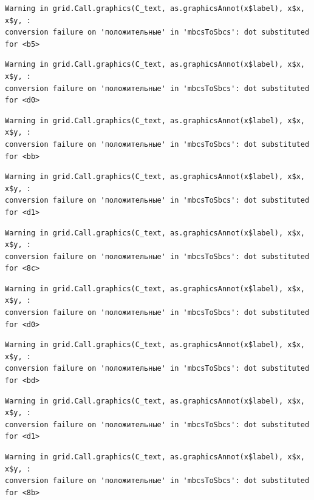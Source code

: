 \documentclass[
  letterpaper,
  DIV=11,
  numbers=noendperiod]{scrreprt}
\theoremstyle{definition}
\theoremstyle{remark}
\begin{document}
\begin{verbatim}
Warning in grid.Call.graphics(C_text, as.graphicsAnnot(x$label), x$x, x$y, :
conversion failure on 'положительные' in 'mbcsToSbcs': dot substituted for <b5>
\end{verbatim}

\begin{verbatim}
Warning in grid.Call.graphics(C_text, as.graphicsAnnot(x$label), x$x, x$y, :
conversion failure on 'положительные' in 'mbcsToSbcs': dot substituted for <d0>
\end{verbatim}

\begin{verbatim}
Warning in grid.Call.graphics(C_text, as.graphicsAnnot(x$label), x$x, x$y, :
conversion failure on 'положительные' in 'mbcsToSbcs': dot substituted for <bb>
\end{verbatim}

\begin{verbatim}
Warning in grid.Call.graphics(C_text, as.graphicsAnnot(x$label), x$x, x$y, :
conversion failure on 'положительные' in 'mbcsToSbcs': dot substituted for <d1>
\end{verbatim}

\begin{verbatim}
Warning in grid.Call.graphics(C_text, as.graphicsAnnot(x$label), x$x, x$y, :
conversion failure on 'положительные' in 'mbcsToSbcs': dot substituted for <8c>
\end{verbatim}

\begin{verbatim}
Warning in grid.Call.graphics(C_text, as.graphicsAnnot(x$label), x$x, x$y, :
conversion failure on 'положительные' in 'mbcsToSbcs': dot substituted for <d0>
\end{verbatim}

\begin{verbatim}
Warning in grid.Call.graphics(C_text, as.graphicsAnnot(x$label), x$x, x$y, :
conversion failure on 'положительные' in 'mbcsToSbcs': dot substituted for <bd>
\end{verbatim}

\begin{verbatim}
Warning in grid.Call.graphics(C_text, as.graphicsAnnot(x$label), x$x, x$y, :
conversion failure on 'положительные' in 'mbcsToSbcs': dot substituted for <d1>
\end{verbatim}

\begin{verbatim}
Warning in grid.Call.graphics(C_text, as.graphicsAnnot(x$label), x$x, x$y, :
conversion failure on 'положительные' in 'mbcsToSbcs': dot substituted for <8b>
\end{verbatim}
\end{document}
